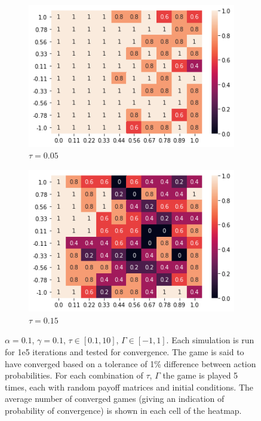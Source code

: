 \documentclass[.../main.tex]{subfiles}
\begin{document}
    \begin{figure}[h]
        \centering
         \begin{subfigure}[b]{0.45 \textwidth}
        \centering
        \includegraphics[width = 0.7 \textwidth]{Figures/AlphaRun_tau_005.png}
        \caption{$\tau = 0.05$}
        \end{subfigure}
        \begin{subfigure}[b]{0.45 \textwidth}
        \centering
        \includegraphics[width = 0.7 \textwidth]{Figures/tau_015.png}
        \caption{$\tau = 0.15$}
        \end{subfigure}

        \caption{$\alpha = 0.1$, $\gamma = 0.1$, $\tau \in [0.1, 10]$, $\Gamma \in [-1, 1]$. Each
        simulation is run for 1e5 iterations and tested for convergence. The game is said to have
        converged based on a tolerance of 1\% difference between action probabilities. For each
        combination of $\tau$, $\Gamma$ the game is played 5 times, each with random payoff matrices
        and initial conditions. The average number of converged games (giving an indication of
        probability of convergence) is shown in each cell of the heatmap. 
        \label{fig::NumericalExperiments}}
    \end{figure}
\end{document}
